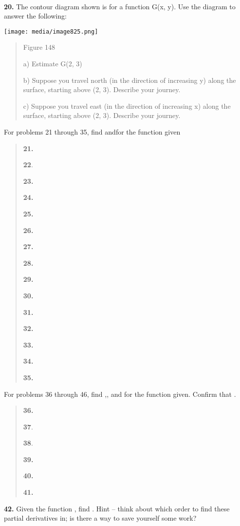 \textbf{\\
}

\textbf{20.} The contour diagram shown is for a function G(x, y). Use
the diagram to answer the following:

\texttt{[image: media/image825.png]}

\begin{quote}
Figure 148

a) Estimate G(2, 3)

b) Suppose you travel north (in the direction of increasing y) along the
surface, starting above (2, 3). Describe your journey.

c) Suppose you travel east (in the direction of increasing x) along the
surface, starting above (2, 3). Describe your journey.
\end{quote}

For problems 21 through 35, find andfor the function given

\begin{quote}
\textbf{21.}

\textbf{22}.

\textbf{23.}

\textbf{24.}

\textbf{25.}

\textbf{26.}

\textbf{27.}

\textbf{28.}

\textbf{29.}

\textbf{30.}

\textbf{31.}

\textbf{32.}

\textbf{33.}

\textbf{34.}

\textbf{35.}
\end{quote}

For problems 36 through 46, find ,, and for the function given. Confirm
that .

\begin{quote}
\textbf{36.}

\textbf{37}.

\textbf{38}.

\textbf{39.}

\textbf{40.}

\textbf{41.}
\end{quote}

\textbf{42.} Given the function , find . Hint -- think about which order
to find these partial derivatives in; is there a way to save yourself
some work?

